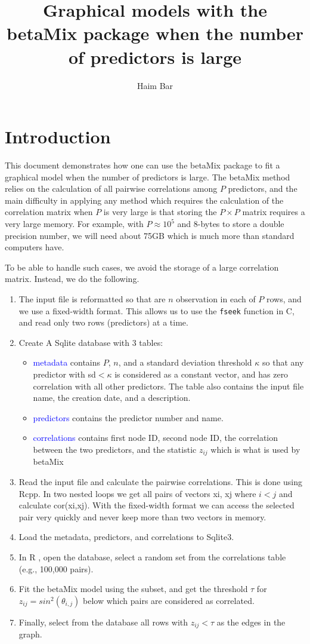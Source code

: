 \documentclass[a4paper,10pt]{article}
\title{Graphical models with the betaMix package when the number of predictors is large}
\author{Haim Bar}
\let\code\texttt
\let\proglang\textsf
\newcommand{\pkg}[1]{{\fontshape{it}\selectfont #1}}
\def\R{\textsf{R} }
\newcommand{\sqltbl}[1]{{\textcolor{blue}{#1}}}
\begin{document}
\maketitle

\section{Introduction}
This document demonstrates how one can use the \pkg{betaMix} package to fit a graphical model when the number of predictors is large. The betaMix method relies on the calculation of all pairwise correlations among $P$ predictors, and the main difficulty in applying any method which requires the calculation of the correlation matrix when $P$ is very large is that storing the $P\times P$ matrix  requires a very large memory. For example, with $P\approx 10^5$ and 8-bytes to store a double precision number, we will need about 75GB which is much more than standard computers have.

To be able to handle such cases, we avoid the storage of a large correlation matrix. Instead, we do the following.
\begin{enumerate}
\item The input file is reformatted so that are $n$ observation in each of $P$ rows, and we use a fixed-width format.
This allows us to use the \code{fseek} function in \proglang{C}, and read only two rows (predictors) at a time.
\item Create A Sqlite database with 3 tables: 
 \begin{itemize}
 \item \sqltbl{metadata} contains $P$, $n$, and a standard deviation threshold $\kappa$ so that any predictor with sd$<\kappa$ is considered as a constant vector, and has zero correlation with all other predictors. The table also contains the input file name, the creation date, and a description.
\item\sqltbl{predictors} contains the predictor number and name.
\item \sqltbl{correlations} contains first node ID, second node ID, the correlation between the two predictors, and the statistic $z_{ij}$ which is what is used by \pkg{betaMix}
\end{itemize}
\item Read the input file and calculate the pairwise correlations. This is done using Rcpp. In two nested loops we get all pairs of vectors xi, xj where $i<j$ and calculate cor(xi,xj). With the fixed-width format we can access the selected pair very quickly and never keep more than two vectors in memory.
\item Load the metadata, predictors, and correlations to Sqlite3.
\item In \R, open the database, select a random set from the correlations table (e.g., 100,000 pairs).
\item Fit the betaMix model using the subset, and get the threshold $\tau$ for $z_{ij}=sin^2(\theta_{i,j})$ below which pairs are considered as correlated.
\item Finally, select from the database all rows with $z_{ij} < \tau$ as the edges in the graph.
\end{enumerate}
\end{document}
